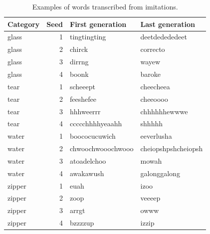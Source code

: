 \documentclass[english,floatsintext,man]{apa6}
\theoremstyle{definition}
\theoremstyle{definition}
\theoremstyle{remark}
\begin{document}
\begin{table}

\caption{\label{tab:table1}Examples of words transcribed from imitations.}
\centering
\begin{tabular}[t]{l|r|l|l}
\hline
Category & Seed & First generation & Last generation\\
\hline
glass & 1 & tingtingting & deetdedededeet\\
\hline
glass & 2 & chirck & correcto\\
\hline
glass & 3 & dirrng & wayew\\
\hline
glass & 4 & boonk & baroke\\
\hline
tear & 1 & scheeept & cheecheea\\
\hline
tear & 2 & feeshefee & cheeoooo\\
\hline
tear & 3 & hhhweerrr & chhhhhhewwwe\\
\hline
tear & 4 & ccccchhhhyeaahh & shhhhh\\
\hline
water & 1 & boococucuwich & eeverlusha\\
\hline
water & 2 & chwoochwooochwooo & cheiopshpshcheiopsh\\
\hline
water & 3 & atoadelchoo & mowah\\
\hline
water & 4 & awakawush & galonggalong\\
\hline
zipper & 1 & euah & izoo\\
\hline
zipper & 2 & zoop & veeeep\\
\hline
zipper & 3 & arrgt & owww\\
\hline
zipper & 4 & bzzzzup & izzip\\
\hline
\end{tabular}
\end{table}
\end{document}
